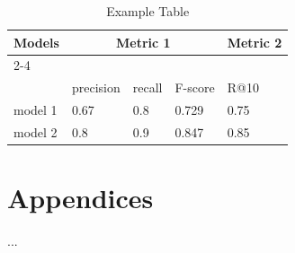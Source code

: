 \documentclass{article}
\begin{document}
        \begin{table}[h]
            \centering
            \label{tab:example-table}
            \caption{Example Table}
            \begin{tabular}{lllll}
                \toprule
                \multirow{2}{*}{Models} & \multicolumn{3}{c}{Metric 1} & Metric 2\\
                \cmidrule{2-4} \cmidrule{5-5} \\
                {} & precision & recall & F-score  & R@10 \\
                \midrule
                model 1 & 0.67  & 0.8 & 0.729  & 0.75 \\
                model 2 & 0.8 & 0.9 & 0.847 & 0.85 \\
                \bottomrule
            \end{tabular}
        \end{table}


\fi
{}



\appendix
\section{Appendices}







%


%


%




\par\noindent ...\par\medskip

\end{document}
